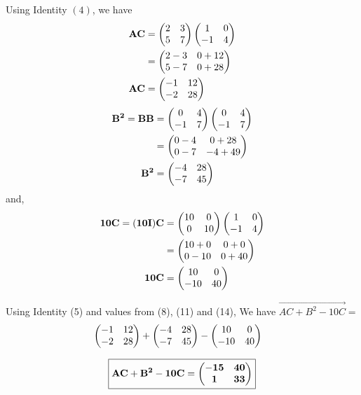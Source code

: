 \documentclass[journal,12pt,twocolumn]{IEEEtran}
\begin{document}
    Using Identity $(4)$, we have
      \begin{align}
      \mathbf{AC}&=
     \begin{pmatrix} 
        2 & 3 \\
        5 & 7
      \end{pmatrix} 
     \begin{pmatrix} 
        1 & 0 \\
        -1 & 4
      \end{pmatrix} \\&=
     \begin{pmatrix} 
        2-3 & 0+12 \\
        5-7 & 0+28
      \end{pmatrix} \\
        \mathbf{AC}&=
       \begin{pmatrix} 
          -1 & 12 \\
          -2 & 28 
        \end{pmatrix} 
      \end{align}
      \begin{align}
      \mathbf{B^2}=\mathbf{BB}
      &=
     \begin{pmatrix} 
        0 & 4 \\
        -1 & 7
      \end{pmatrix} 
     \begin{pmatrix} 
        0 & 4 \\
        -1 & 7
      \end{pmatrix}\\&= 
     \begin{pmatrix} 
        0-4 & 0+28 \\
        0-7 & -4+49
      \end{pmatrix} \\
      \mathbf{B^2}&=
     \begin{pmatrix} 
        -4 & 28 \\
        -7 & 45 
      \end{pmatrix} 
    \end{align}
    and,
      \begin{align}
      \mathbf{10C}=\mathbf{(10I)C} &=
     \begin{pmatrix} 
        10 & 0 \\
        0 & 10
      \end{pmatrix} 
     \begin{pmatrix} 
        1 & 0 \\
        -1 & 4
      \end{pmatrix} 
        \\&=
     \begin{pmatrix} 
        10+0 & 0+0 \\
        0-10 & 0+40
      \end{pmatrix} \\
      \mathbf{10C}&=
     \begin{pmatrix} 
        10 & 0 \\
        -10 & 40
      \end{pmatrix} 
    \end{align}
  
    
    Using Identity (5) and values from (8), (11) and (14), We have
    $\vec{AC+B^2-10C}=$
    \begin{align}
      & 
     \begin{pmatrix} 
        -1 & 12 \\
        -2 & 28
      \end{pmatrix} 
      +
     \begin{pmatrix} 
        -4 & 28 \\
        -7 & 45
      \end{pmatrix} 
      -
     \begin{pmatrix} 
        10 & 0 \\
        -10 & 40
      \end{pmatrix} 
    \end{align}
    
    \begin{equation}
      \boxed{\mathbf{\mathbf{AC+B^2-10C}} =
       \begin{pmatrix} 
          \mathbf{-15} & \mathbf{40} \\
          \mathbf{1} & \mathbf{33}
        \end{pmatrix} 
        }  
    \end{equation}
\end{document}
